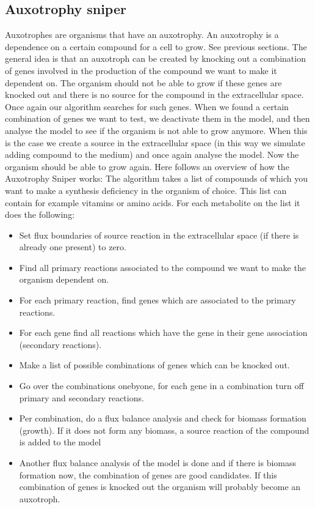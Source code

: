 \documentclass[12pt]{report}
\begin{document}
\subsection{Auxotrophy sniper}
Auxotrophes are organisms that have an auxotrophy. An auxotrophy is a dependence on a certain compound for a cell to grow. See previous sections.
The general idea is that an auxotroph can be created by knocking out a combination of genes involved in the production of the compound we want to make it dependent on.
The organism should not be able to grow if these genes are knocked out and there is no source for the compound in the extracellular space.
Once again our algorithm searches for such genes. When we found a certain combination of genes we want to test, we deactivate them in the model, and then analyse the model to see if the organism is not able to grow anymore.
When this is the case we create a source in the extracellular space (in this way we simulate adding compound to the medium) and once again analyse the model. Now the organism should be able to grow again. Here follows an overview of how the Auxotrophy Sniper works: 
The algorithm takes a list of compounds of which you want to make a synthesis deficiency in the 
organism of choice. This list can contain for example vitamins or amino acids. For each 
metabolite on the list it does the following:
\begin{itemize}
\item Set flux boundaries of source reaction in the extracellular space (if there is already one 
present) to zero. 
\item Find all primary reactions associated to the compound we want to make the organism 
dependent on. 
\item For each primary reaction, find genes which are associated to the primary reactions. 
\item For each gene find all reactions which have the gene in their gene association 
(secondary reactions). 
\item Make a list of possible combinations of genes which can be knocked out. 
\item Go over the combinations one­by­one, for each gene in a combination turn off primary 
and secondary reactions. 
\item Per combination, do a flux balance analysis and check for biomass formation (growth). 
If it does not form any biomass, a source reaction of the compound is added to the 
model
\item Another flux balance analysis of the model is done and if there is biomass formation 
now, the combination of genes are good candidates. If this combination of genes is 
knocked out the organism will probably become an auxotroph.
\end{itemize}
\end{document}
